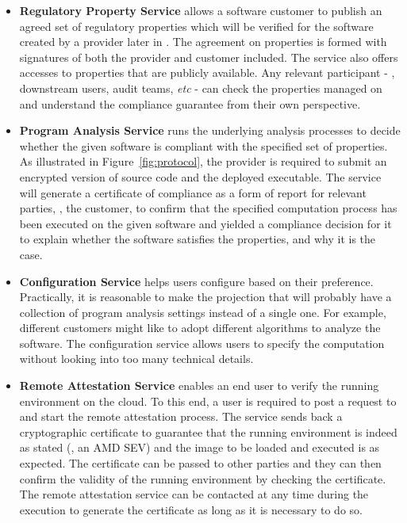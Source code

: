 \begin{itemize}[leftmargin=*]

\item \textbf{Regulatory Property Service} allows a software customer to publish an agreed set of 
regulatory properties which will be verified for the software created by a provider later in \tool. 
The agreement on properties is formed with signatures of both the provider and customer 
included. The service also offers accesses to properties that are publicly available. Any relevant 
participant - \eg, downstream users, audit teams, \textit{etc} - can check the properties managed on \tool 
and understand the compliance guarantee from their own perspective.

\item \textbf{Program Analysis Service} runs the underlying analysis processes to decide whether the 
given software is compliant with the specified set of properties. As illustrated in Figure~\ref{fig:protocol}, 
the provider is required to submit an encrypted version of source code and the deployed executable. 
The service will generate a certificate of compliance as a form of report for relevant parties, \eg, the 
customer, to confirm that the specified computation process has been executed on the given software and 
yielded a compliance decision for it to explain whether the software satisfies the properties, and why it 
is the case.

\item \textbf{Configuration Service} helps users configure \tool based on their preference. 
Practically, it is reasonable to make the projection that \tool will probably have a collection 
of program analysis settings instead of a single one. For example, different customers might like to adopt 
different algorithms to analyze the software. The configuration service allows users to specify the computation 
without looking into too many technical details. 

\item \textbf{Remote Attestation Service} enables an end user to verify the running environment 
on the cloud. To this end, a user is required to post a request to \tool and start the remote attestation 
process. The service sends back a cryptographic certificate to guarantee that the running environment is indeed 
as stated (\eg, an AMD SEV) and the image to be loaded and executed is as expected. The certificate can be passed to 
other parties and they can then confirm the validity of the running environment by checking the certificate. 
The remote attestation service can be contacted at any time during the execution to generate the certificate as long 
as it is necessary to do so.

\end{itemize}


